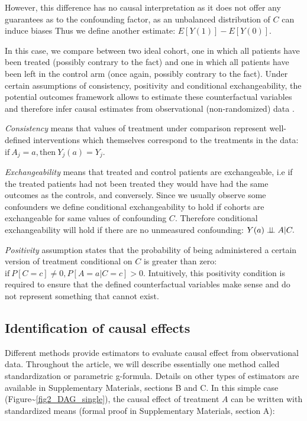 \documentclass[a4paper,12pt,twoside,onecolumn,openright,final,oldfontcommands]{memoir}
\begin{document}
However, this difference has no causal interpretation as it does not
offer any guarantees as to the confounding factor, as an unbalanced
distribution of \(C\) can induce biases Thus we define another estimate:
\(E[Y(1)] - E[Y(0)].\)

In this case, we compare between two ideal cohort, one in which all
patients have been treated (possibly contrary to the fact) and one in
which all patients have been left in the control arm (once again,
possibly contrary to the fact). Under certain assumptions of
consistency, positivity and conditional exchangeability, the potential
outcomes framework allows to estimate these counterfactual variables and
therefore infer causal estimates from observational (non-randomized)
data \citep[\citet{hernan2020causal}]{rubin1974estimating}.

\emph{Consistency} means that values of treatment under comparison
represent well-defined interventions which themselves correspond to the
treatments in the data:
\(\textrm{if} \: A_j=a, \textrm{then} \: Y_j(a)=Y_j.\)

\emph{Exchangeability} means that treated and control patients are
exchangeable, i.e if the treated patients had not been treated they
would have had the same outcomes as the controls, and conversely. Since
we usually observe some confounders we define conditional
exchangeability to hold if cohorts are exchangeable for same values of
confounding \(C\). Therefore conditional exchangeability will hold if
there are no unmeasured confounding: \(Y(a) \perp \!\!\! \perp A | C.\)

\emph{Positivity} assumption states that the probability of being
administered a certain version of treatment conditional on \(C\) is
greater than zero: \(\textrm{if} \: P[C=c] \neq 0, P[A=a | C=c] >0.\)
Intuitively, this positivity condition is required to ensure that the
defined counterfactual variables make sense and do not represent
something that cannot exist.

\subsection{Identification of causal
effects}\label{identification-of-causal-effects}

Different methods provide estimators to evaluate causal effect from
observational data. Throughout the article, we will describe essentially
one method called standardization or parametric g-formula. Details on
other types of estimators are available in Supplementary Materials,
sections B and C. In this simple case
(Figure\textasciitilde{}\ref{fig2_DAG_single}), the causal effect of
treatment \(A\) can be written with standardized means (formal proof in
Supplementary Materials, section A):
\end{document}
